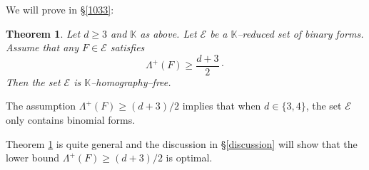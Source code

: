 \documentclass[10pt]{article}
\newtheorem{theorem}{Theorem}[section]
\theoremstyle{definition}
\numberwithin{equation}{section}
\newcommand {\K}{{\mathbb{K}}}
\begin{document}
We will prove in \S \ref{1033}:
\begin{theorem}\label{486}
 Let $d\geqslant 3$ and $\K$ as above. Let $\mathcal E$ be a $\K$--reduced set of binary forms. Assume that any $F\in\mathcal E$ satisfies
 \[ 
 \Lambda^+ (F) \geqslant \frac{d+3} 2 \cdotp
 \]
 Then the set $\mathcal E$ is $\K$--homography--free.
\end{theorem}

The assumption $ \Lambda^+ (F) \geqslant (d+3)/2$ implies that when $d\in\{3,4\}$, the set $\mathcal E$ only contains binomial forms.

Theorem \ref{486} is quite general and the discussion in \S \ref{discussion} will show that the lower bound
$\Lambda^+ (F) \geqslant (d+3)/2$ is optimal.

\end{document}
